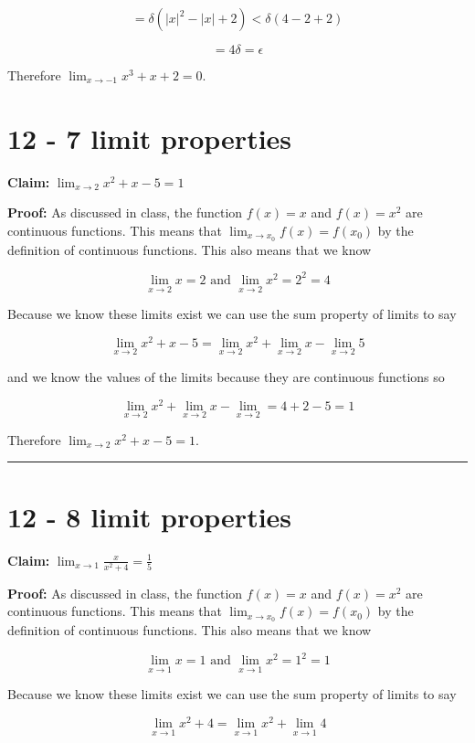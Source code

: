 \documentclass[10pt,letterpaper]{article}
\newcommand\ds{\displaystyle}
\newcommand\qedsym{\hfill \rule{2mm}{2mm}}
\begin{document}
\[=\delta (|x|^2 - |x| + 2) < \delta (4 - 2 + 2)\]

\[= 4\delta = \epsilon\]

Therefore $\ds\lim_{x\to -1} x^3 + x + 2 = 0$.

\section*{12 - 7 limit properties}

\textbf{Claim:} $\ds\lim_{x\to 2} x^2 + x - 5 = 1$

\medskip

\textbf{Proof:} As discussed in class, the function $f(x) = x$ and $f(x) = x^2$ are continuous functions. This means that $\ds\lim_{x\to x_0} f(x) = f(x_0)$ by the definition of continuous functions. This also means that we know

\[\lim_{x\to 2} x = 2 \text{ and } \lim_{x\to 2} x^2 = 2^2 = 4\]

Because we know these limits exist we can use the sum property of limits to say

\[\ds\lim_{x\to 2} x^2 + x - 5 = \lim_{x\to 2}x^2 + \lim_{x\to 2} x - \lim_{x\to 2} 5\]

and we know the values of the limits because they are continuous functions so

\[\lim_{x\to 2}x^2 + \lim_{x\to 2} x - \lim_{x\to 2} = 4 + 2 - 5 = 1\]

Therefore $\ds\lim_{x\to 2} x^2 + x - 5 = 1$.

\qedsym

\section*{12 - 8 limit properties}

\textbf{Claim:} $\ds\lim_{x\to 1} \frac{x}{x^2 + 4} = \frac{1}{5}$

\medskip

\textbf{Proof:} As discussed in class, the function $f(x) = x$ and $f(x) = x^2$ are continuous functions. This means that $\ds\lim_{x\to x_0} f(x) = f(x_0)$ by the definition of continuous functions. This also means that we know

\[\lim_{x\to 1} x = 1 \text{ and } \lim_{x\to 1} x^2 = 1^2 = 1\]

Because we know these limits exist we can use the sum property of limits to say

\[\lim_{x\to 1}x^2+4 = \lim_{x\to 1}x^2 + \lim_{x\to 1} 4\]
\end{document}
